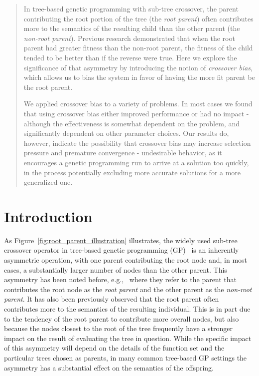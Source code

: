 \documentclass{sig-alternate}
\begin{document}
\begin{abstract}

In tree-based genetic programming with sub-tree crossover, the parent contributing the root portion of the tree (the
\emph{root parent}) often contributes more to the semantics of the resulting child than the other parent (the
\emph{non-root parent}). Previous research demonstrated that when the root parent had greater fitness than the non-root
parent, the fitness of the child tended to be better than if the reverse were true. Here we explore the significance of
that asymmetry by introducing the notion of \emph{crossover bias}, which allows us to bias the system in favor of
having the more fit parent be the root parent.

We applied crossover bias to a variety of problems. In most cases we found that using crossover bias either improved
performance or had no impact - although the effectiveness is somewhat dependent on the problem, and significantly dependent on other parameter choices. Our results do, however, indicate the possibility that crossover bias may increase selection pressure and premature convergence - undesirable behavior, as it encourages a genetic programming run to arrive at a solution too quickly, in the process potentially excluding more accurate solutions for a more generalized one.

\end{abstract}

\category{}{}{}
\terms{}

\section{Introduction} \label{sec:Introduction}

As Figure~\ref{fig:root_parent_illustration} illustrates, the widely used sub-tree crossover operator in tree-based 
genetic programming (GP)~\cite{poli08:fieldguide} is an inherently
asymmetric operation, with one parent contributing the root node and, in most cases, a substantially larger
number of nodes than the other parent. This asymmetry has been noted before, e.g.,~\cite{mcphee1999analysis}
where they refer to the parent that contributes the root node as the \emph{root parent} and the other parent as
the \emph{non-root parent}.
It has also been previously observed 
\cite{burlacu2013visualization, McPheeDonatucciDramdahl:2014,  McPhee:2008:SBB:1792694.1792707} 
that the root parent often contributes more to the semantics of the resulting 
individual. This is in part due to the tendency of the root parent to contribute more 
overall nodes, but also because the nodes closest to the root of the tree frequently have a stronger
impact on the result of evaluating the tree in question. While the specific impact of this asymmetry will 
depend on the details of the function set and the particular trees chosen as parents, in many common 
tree-based GP settings the asymmetry has a substantial effect on the semantics of the offspring.
\end{document}
